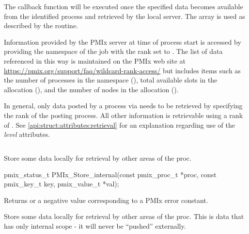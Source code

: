 \descr

The callback function will be executed once the specified data becomes available from the identified process and retrieved by the local server.
The  array is used as described by the  routine.

\adviceuserstart
Information provided by the \ac{PMIx} server at time of process start is accessed by providing the namespace of the job with the rank set to . The list of data referenced in this way is maintained on the \ac{PMIx} web site at \url{https://pmix.org/support/faq/wildcard-rank-access/} but includes items such as the number of processes in the namespace (), total available slots in the allocation (), and the number of nodes in the allocation ().

In general, only data posted by a process via  needs to be retrieved by specifying the rank of the posting process. All other information is retrievable using a rank of . See \ref{api:struct:attributes:retrieval} for an explanation regarding use of the \emph{level} attributes.
\adviceuserend


\subsection{}

\summary

Store some data locally for retrieval by other areas of the proc.

\format

\cspecificstart
\begin{codepar}
pmix_status_t
PMIx_Store_internal(const pmix_proc_t *proc,
                    const pmix_key_t key,
                    pmix_value_t *val);
\end{codepar}
\cspecificend

\begin{arglist}
\end{arglist}

Returns  or a negative value corresponding to a PMIx error constant.

\descr

Store some data locally for retrieval by other areas of the proc.
This is data that has only internal scope - it will never be ``pushed'' externally.

